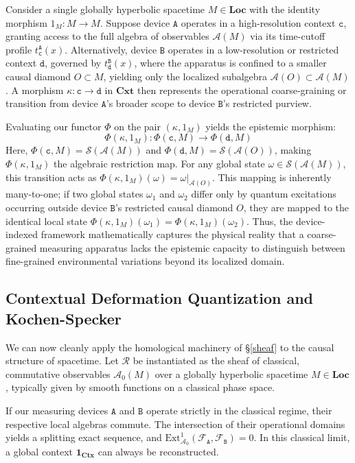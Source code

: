 \documentclass{article}
\numberwithin{tm}{section}
\numberwithin{dn}{section}
\numberwithin{as}{section}
\numberwithin{rk}{section}
\numberwithin{lem}{section}
\numberwithin{ax}{section}
\numberwithin{pp}{section}
\numberwithin{eg}{section}
\numberwithin{war}{section}
\numberwithin{equation}{section}
\numberwithin{prop}{section}
\numberwithin{nt}{section}
\numberwithin{rc}{section}
\def\code#1{\texttt{#1}}
\begin{document}
Consider a single globally hyperbolic spacetime $M \in \mathbf{Loc}$ with the identity morphism $1_M : M \to M$. Suppose device $\code{A}$ operates in a high-resolution context $\code{c}$, granting access to the full algebra of observables $\mathcal{A}(M)$ via its time-cutoff profile $t_{\code{c}}^{\code{A}}(x)$. Alternatively, device $\code{B}$ operates in a low-resolution or restricted context $\code{d}$, governed by $t_{\code{d}}^{\code{B}}(x)$, where the apparatus is confined to a smaller causal diamond $O \subset M$, yielding only the localized subalgebra $\mathcal{A}(O) \subset \mathcal{A}(M)$. A morphism $\kappa: \code{c} \to \code{d}$ in $\mathbf{Cxt}$ then represents the operational coarse-graining or transition from device $\code{A}$'s broader scope to device $\code{B}$'s restricted purview. 

Evaluating our functor $\Phi$ on the pair $(\kappa, 1_M)$ yields the epistemic morphism:
$$
\Phi(\kappa, 1_M) : \Phi(\code{c}, M) \to \Phi(\code{d}, M)
$$
Here, $\Phi(\code{c}, M) = \mathcal{S}(\mathcal{A}(M))$ and $\Phi(\code{d}, M) = \mathcal{S}(\mathcal{A}(O))$, making $\Phi(\kappa, 1_M)$ the algebraic restriction map. For any global state $\omega \in \mathcal{S}(\mathcal{A}(M))$, this transition acts as $\Phi(\kappa, 1_M)(\omega) = \omega|_{\mathcal{A}(O)}$. This mapping is inherently many-to-one; if two global states $\omega_1$ and $\omega_2$ differ only by quantum excitations occurring outside device $\code{B}$'s restricted causal diamond $O$, they are mapped to the identical local state $\Phi(\kappa, 1_M)(\omega_1) = \Phi(\kappa, 1_M)(\omega_2)$. Thus, the device-indexed framework mathematically captures the physical reality that a coarse-grained measuring apparatus lacks the epistemic capacity to distinguish between fine-grained environmental variations beyond its localized domain.

\subsection{Contextual Deformation Quantization and Kochen-Specker} \label{ContDef}

We can now cleanly apply the homological machinery of \S\ref{sheaf} to the causal structure of spacetime. Let $\mathcal{R}$ be instantiated as the sheaf of classical, commutative observables $\mathcal{A}_0(M)$ over a globally hyperbolic spacetime $M \in \mathbf{Loc}$, typically given by smooth functions on a classical phase space.

If our measuring devices $\code{A}$ and $\code{B}$ operate strictly in the classical regime, their respective local algebras commute. The intersection of their operational domains yields a splitting exact sequence, and $\text{Ext}^1_{\mathcal{A}_0}(\mathcal{F}_\code{A}, \mathcal{F}_\code{B}) = 0$. In this classical limit, a global context $\mathbf{1}_{\mathbf{Ctx}}$ can always be reconstructed.
\end{document}
